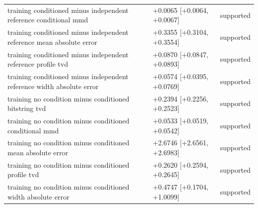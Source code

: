 \begin{table}[p]
\begin{tabular}{@{}p{}p{}p{}@{}}
training conditioned minus independent reference conditional mmd & +0.0065 [+0.0064, +0.0067] & supported \\
training conditioned minus independent reference mean absolute error & +0.3355 [+0.3104, +0.3554] & supported \\
training conditioned minus independent reference profile tvd & +0.0870 [+0.0847, +0.0893] & supported \\
training conditioned minus independent reference width absolute error & +0.0574 [+0.0395, +0.0769] & supported \\
training no condition minus conditioned bitstring tvd & +0.2394 [+0.2256, +0.2523] & supported \\
training no condition minus conditioned conditional mmd & +0.0533 [+0.0519, +0.0542] & supported \\
training no condition minus conditioned mean absolute error & +2.6746 [+2.6561, +2.6983] & supported \\
training no condition minus conditioned profile tvd & +0.2620 [+0.2594, +0.2645] & supported \\
training no condition minus conditioned width absolute error & +0.4747 [+0.1704, +1.0099] & supported \\
\bottomrule
\end{tabular}
\end{table}
\clearpage

